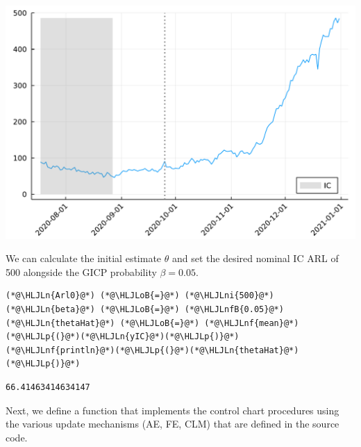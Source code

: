 \documentclass[12pt,a4paper]{article}
\newcommand{\HLJLn}[1]{#1}
\newcommand{\HLJLnf}[1]{\textcolor[RGB]{66,102,213}{#1}}
\newcommand{\HLJLnfB}[1]{\textcolor[RGB]{59,151,46}{#1}}
\newcommand{\HLJLni}[1]{\textcolor[RGB]{59,151,46}{#1}}
\newcommand{\HLJLoB}[1]{\textcolor[RGB]{102,102,102}{\textbf{#1}}}
\newcommand{\HLJLp}[1]{#1}
\begin{document}
\includegraphics[width=\linewidth]{figures/admissionsICU_6_1.pdf}

We can calculate the initial estimate $\hat{\theta}$ and set the desired nominal IC ARL of 500 alongside the GICP probability $\beta = 0.05$.


\begin{lstlisting}
(*@\HLJLn{Arl0}@*) (*@\HLJLoB{=}@*) (*@\HLJLni{500}@*)
(*@\HLJLn{beta}@*) (*@\HLJLoB{=}@*) (*@\HLJLnfB{0.05}@*)
(*@\HLJLn{thetaHat}@*) (*@\HLJLoB{=}@*) (*@\HLJLnf{mean}@*)(*@\HLJLp{(}@*)(*@\HLJLn{yIC}@*)(*@\HLJLp{)}@*)
(*@\HLJLnf{println}@*)(*@\HLJLp{(}@*)(*@\HLJLn{thetaHat}@*)(*@\HLJLp{)}@*)
\end{lstlisting}

\begin{lstlisting}
66.41463414634147
\end{lstlisting}


Next, we define a function that implements the control chart procedures using the various update mechanisms (AE, FE, CLM) that are defined in the source code.
\end{document}
